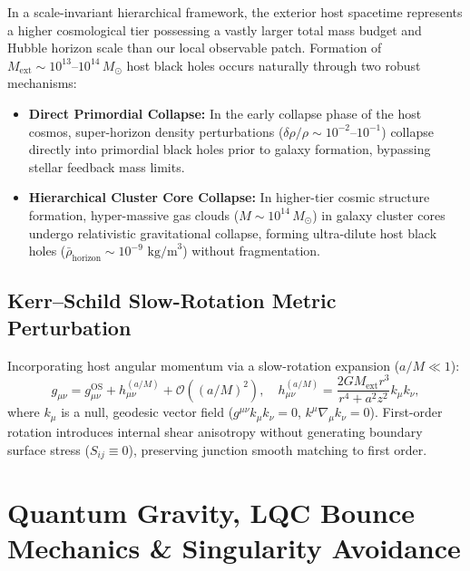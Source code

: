 \documentclass[11pt,a4paper]{article}
\theoremstyle{definition}
\begin{document}
In a scale-invariant hierarchical framework, the exterior host spacetime represents a higher cosmological tier possessing a vastly larger total mass budget and Hubble horizon scale than our local observable patch. Formation of $M_{\text{ext}} \sim 10^{13} \text{--} 10^{14} \, M_\odot$ host black holes occurs naturally through two robust mechanisms:
\begin{itemize}
    \item \textbf{Direct Primordial Collapse:} In the early collapse phase of the host cosmos, super-horizon density perturbations ($\delta\rho/\rho \sim 10^{-2} \text{--} 10^{-1}$) collapse directly into primordial black holes prior to galaxy formation, bypassing stellar feedback mass limits.
    \item \textbf{Hierarchical Cluster Core Collapse:} In higher-tier cosmic structure formation, hyper-massive gas clouds ($M \sim 10^{14} \, M_\odot$) in galaxy cluster cores undergo relativistic gravitational collapse, forming ultra-dilute host black holes ($\bar{\rho}_{\text{horizon}} \sim 10^{-9} \text{ kg/m}^3$) without fragmentation.
\end{itemize}

\subsection{Kerr--Schild Slow-Rotation Metric Perturbation}\label{sec:kerr_extension}
Incorporating host angular momentum via a slow-rotation expansion ($a/M \ll 1$):
\begin{equation}\label{eq:kerr_schild}
    g_{\mu\nu} = g_{\mu\nu}^{\text{OS}} + h_{\mu\nu}^{(a/M)} + \mathcal{O}\left((a/M)^2\right), \quad h_{\mu\nu}^{(a/M)} = \frac{2GM_{\text{ext}}r^3}{r^4 + a^2 z^2} k_\mu k_\nu,
\end{equation}
where $k_\mu$ is a null, geodesic vector field ($g^{\mu\nu} k_\mu k_\nu = 0$, $k^\mu \nabla_\mu k_\nu = 0$). First-order rotation introduces internal shear anisotropy without generating boundary surface stress ($S_{ij} \equiv 0$), preserving junction smooth matching to first order.

\section{Quantum Gravity, LQC Bounce Mechanics \& Singularity Avoidance}\label{sec:lqc_bounce}
\end{document}
